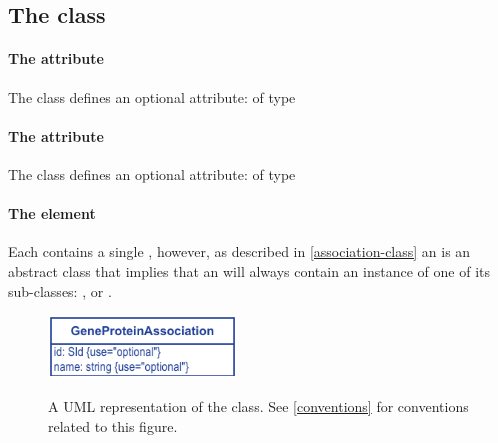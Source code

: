\subsection{The \FBC {} class}
\label{geneproteinassociation-class}


\paragraph{The  attribute}
The \GeneProteinAssociation class defines an optional attribute:  of type 

\paragraph{The  attribute}
The \GeneProteinAssociation class defines an optional attribute:  of type 


\paragraph{The  element}
Each \GeneProteinAssociation contains a single \Association, however, as described in \ref{association-class} an \Association is an abstract class that implies that an  will always contain an instance of one of its sub-classes: \GeneAnd, \GeneOr or \GeneProductRef.
%
\begin{figure}[h!]
  \centering
  \includegraphics[width=5cm]{images/v2harmony_fbc_geneproductassociation.pdf}\\
  \caption{A UML representation of the \FBCPackage \GeneProteinAssociation class. 
	See  \ref{conventions} for conventions related to this figure.}
  \label{fig:fbc_uml_ga}
\end{figure}

